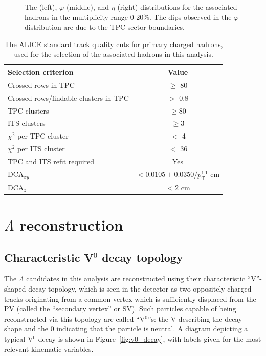 \begin{figure}[t!]
\begin{minipage}{0.32\textwidth}
	\end{minipage}
	\caption{The \pt (left), $\varphi$ (middle), and $\eta$ (right) distributions for the associated hadrons in the multiplicity range 0-20\%. The dips observed in the $\varphi$ distribution are due to the TPC sector boundaries.}
	\label{fig:assoc_plots}
\end{figure}

\begin{table}[h]
	\centering
	\caption{The ALICE standard track quality cuts for primary charged hadrons, used for the selection of the associated hadrons in this analysis.}
	\label{tab:primary_track_cuts}
	\begin{tabular}{ l  c }
		\hline
		Selection criterion & Value \\
		\hline
		Crossed rows in TPC & $\geq$ 80 \\
		Crossed rows/findable clusters in TPC & $>$ 0.8 \\
		TPC clusters & $\geq 80$ \\
		ITS clusters & $\geq 3$ \\
		$\chi^{2}$ per TPC cluster  & $<$ 4 \\
		$\chi^{2}$ per ITS cluster  & $<$ 36 \\
		TPC and ITS refit required & Yes \\
		DCA$_{xy}$ & $< 0.0105 + 0.0350/p_{\text{T}}^{1.1}$ cm \\
		DCA$_{z}$ & $< 2$ cm \\
		\hline
	\end{tabular}
\end{table}

\section{$\Lambda$ reconstruction}
\label{sec:lambda_reconstruction}

\subsection{Characteristic V$^0$ decay topology}
\label{sec:v0_decay}

The $\Lambda$ candidates in this analysis are reconstructed using their characteristic ``V''-shaped decay topology, which is seen in the detector as two oppositely charged tracks originating from a common vertex which is sufficiently displaced from the PV (called the ``secondary vertex'' or SV). Such particles capable of being reconstructed via this topology are called ``V$^0$''s: the V describing the decay shape and the 0 indicating that the particle is neutral. A diagram depicting a typical V$^0$ decay is shown in Figure~\ref{fig:v0_decay}, with labels given for the most relevant kinematic variables.

